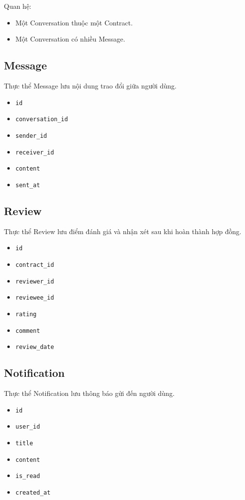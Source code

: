 Quan hệ:

\begin{itemize}
    \item Một Conversation thuộc một Contract.
    \item Một Conversation có nhiều Message.
\end{itemize}

\subsection{Message}

Thực thể Message lưu nội dung trao đổi giữa người dùng.

\begin{itemize}
    \item \texttt{id}
    \item \texttt{conversation\_id}
    \item \texttt{sender\_id}
    \item \texttt{receiver\_id}
    \item \texttt{content}
    \item \texttt{sent\_at}
\end{itemize}

\subsection{Review}

Thực thể Review lưu điểm đánh giá và nhận xét sau khi hoàn thành hợp đồng.

\begin{itemize}
    \item \texttt{id}
    \item \texttt{contract\_id}
    \item \texttt{reviewer\_id}
    \item \texttt{reviewee\_id}
    \item \texttt{rating}
    \item \texttt{comment}
    \item \texttt{review\_date}
\end{itemize}

\subsection{Notification}

Thực thể Notification lưu thông báo gửi đến người dùng.

\begin{itemize}
    \item \texttt{id}
    \item \texttt{user\_id}
    \item \texttt{title}
    \item \texttt{content}
    \item \texttt{is\_read}
    \item \texttt{created\_at}
\end{itemize}

